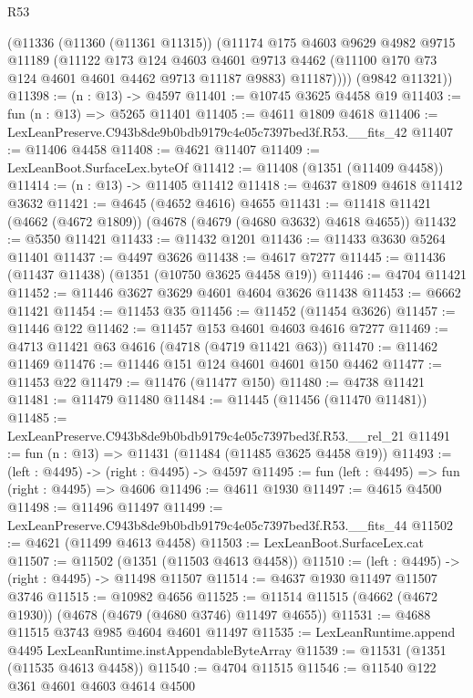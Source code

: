 \begin{lexlean}{R53}
\begin{coremodule}
        (@11336
          (@11360 (@11361 @11315))
          (@11174
            @175
            @4603
            @9629
            @4982
            @9715
            @11189
            (@11122
              @173
              @124
              @4603
              @4601
              @9713
              @4462
              (@11100 @170 @73 @124 @4601 @4601 @4462 @9713 @11187 @9883)
              @11187))))
      (@9842 @11321))
@11398 := (n : @13) -> @4597
@11401 := @10745 @3625 @4458 @19
@11403 := fun (n : @13) => @5265 @11401
@11405 := @4611 @1809 @4618
@11406 := LexLeanPreserve.C943b8de9b0bdb9179c4e05c7397bed3f.R53.__fits_42
@11407 := @11406 @4458
@11408 := @4621 @11407
@11409 := LexLeanBoot.SurfaceLex.byteOf
@11412 := @11408 (@1351 (@11409 @4458))
@11414 := (n : @13) -> @11405 @11412
@11418 := @4637 @1809 @4618 @11412 @3632
@11421 := @4645 (@4652 @4616) @4655
@11431 := @11418 @11421 (@4662 (@4672 @1809)) (@4678 (@4679 (@4680 @3632) @4618 @4655))
@11432 := @5350 @11421
@11433 := @11432 @1201
@11436 := @11433 @3630 @5264 @11401
@11437 := @4497 @3626
@11438 := @4617 @7277
@11445 := @11436 (@11437 @11438) (@1351 (@10750 @3625 @4458 @19))
@11446 := @4704 @11421
@11452 := @11446 @3627 @3629 @4601 @4604 @3626 @11438
@11453 := @6662 @11421
@11454 := @11453 @35
@11456 := @11452 (@11454 @3626)
@11457 := @11446 @122
@11462 := @11457 @153 @4601 @4603 @4616 @7277
@11469 := @4713 @11421 @63 @4616 (@4718 (@4719 @11421 @63))
@11470 := @11462 @11469
@11476 := @11446 @151 @124 @4601 @4601 @150 @4462
@11477 := @11453 @22
@11479 := @11476 (@11477 @150)
@11480 := @4738 @11421
@11481 := @11479 @11480
@11484 := @11445 (@11456 (@11470 @11481))
@11485 := LexLeanPreserve.C943b8de9b0bdb9179c4e05c7397bed3f.R53.__rel_21
@11491 := fun (n : @13) => @11431 (@11484 (@11485 @3625 @4458 @19))
@11493 := (left : @4495) -> (right : @4495) -> @4597
@11495 := fun (left : @4495) => fun (right : @4495) => @4606
@11496 := @4611 @1930
@11497 := @4615 @4500
@11498 := @11496 @11497
@11499 := LexLeanPreserve.C943b8de9b0bdb9179c4e05c7397bed3f.R53.__fits_44
@11502 := @4621 (@11499 @4613 @4458)
@11503 := LexLeanBoot.SurfaceLex.cat
@11507 := @11502 (@1351 (@11503 @4613 @4458))
@11510 := (left : @4495) -> (right : @4495) -> @11498 @11507
@11514 := @4637 @1930 @11497 @11507 @3746
@11515 := @10982 @4656
@11525 := @11514 @11515 (@4662 (@4672 @1930)) (@4678 (@4679 (@4680 @3746) @11497 @4655))
@11531 := @4688 @11515 @3743 @985 @4604 @4601 @11497
@11535 := LexLeanRuntime.append @4495 LexLeanRuntime.instAppendableByteArray
@11539 := @11531 (@1351 (@11535 @4613 @4458))
@11540 := @4704 @11515
@11546 := @11540 @122 @361 @4601 @4603 @4614 @4500

\end{coremodule}
\end{lexlean}
